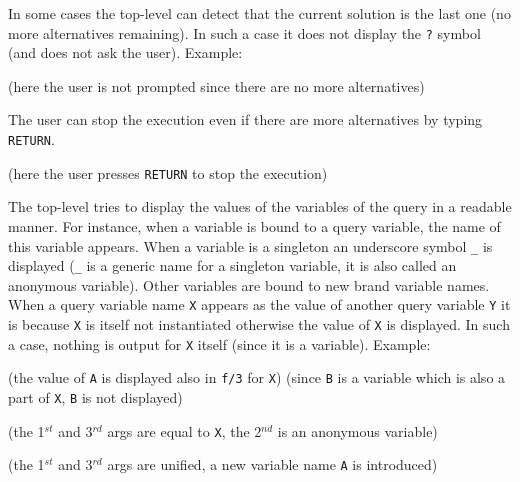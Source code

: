 In some cases the top-level can detect that the current solution is the last
one (no more alternatives remaining). In such a case it does not display the
\texttt{?} symbol (and does not ask the user). Example:

\begin{CodeTwoCols}
\SkipLine
{}
\SkipLine
{}  {(here the user is not prompted since there are no more
alternatives)}
\SkipLine
{}
\end{CodeTwoCols}

The user can stop the execution even if there are more alternatives by
typing \texttt{RETURN}.

\begin{CodeTwoCols}
\SkipLine
{} {(here the user presses \texttt{RETURN} to stop the execution)}
\SkipLine
{}
\end{CodeTwoCols}

The top-level tries to display the values of the variables of the query in a
readable manner. For instance, when a variable is bound to a query variable,
the name of this variable appears. When a variable is a singleton an
underscore symbol \texttt{\_} is displayed (\texttt{\_} is a generic name
for a singleton variable, it is also called an anonymous variable). Other
variables are bound to new brand variable names. When a query variable name
\texttt{X} appears as the value of another query variable \texttt{Y} it is
because \texttt{X} is itself not instantiated otherwise the value of
\texttt{X} is displayed. In such a case, nothing is output for \texttt{X}
itself (since it is a variable). Example: 

\begin{CodeTwoCols}
\SkipLine
{} {(the value of \texttt{A} is displayed also in \texttt{f/3} for
\texttt{X})}
 {(since \texttt{B} is a variable which is also a part
of \texttt{X}, \texttt{B} is not displayed)}
\end{CodeTwoCols}

\begin{CodeTwoCols}
\SkipLine
{} {(the 1$^{st}$ and 3$^{rd}$ args are equal to \texttt{X},
the 2$^{nd}$ is an anonymous variable)}
\end{CodeTwoCols}

\begin{CodeTwoCols}
\SkipLine
{} {(the 1$^{st}$ and 3$^{rd}$ args are unified, a new
variable name \texttt{A} is introduced)}
\end{CodeTwoCols}

